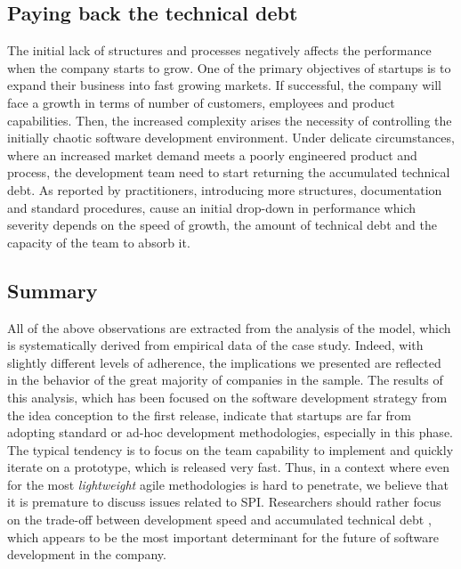 \documentclass[10pt,journal,letterpaper,compsoc]{IEEEtran}
\begin{document}
\subsection{Paying back the technical debt} 
The initial lack of structures and processes negatively affects the  
performance when the company starts to grow.
One of the primary objectives of  startups is to expand their business into fast
growing markets. If  successful, the company will face a growth in terms of
number of customers,  employees and product capabilities. Then, the increased
complexity arises the  necessity of controlling the initially chaotic software
development environment.  Under delicate circumstances, where an increased
market demand meets a poorly  engineered product and process, the development
team need to start returning  the accumulated technical debt. As reported by
practitioners, introducing more  structures, documentation and standard
procedures, cause an initial drop-down in  performance which severity depends on
the speed of growth, the amount of  technical debt and the capacity of the team
to absorb it.  



\subsection{Summary} All of the above observations are extracted from the
analysis of the model,  which is systematically derived from empirical data of
the case study. Indeed,  with slightly different levels of adherence, the
implications we presented are  reflected in the behavior of the great majority
of companies in the sample. The  results of this analysis, which has been
focused on the software development  strategy from the idea conception to the
first release, indicate that startups  are far from adopting standard or ad-hoc
development methodologies, especially  in this phase. The typical tendency is to
focus on the team capability to  implement and quickly iterate on a prototype,
which is released very fast. Thus,  in a context where even for the most
\textit{lightweight} agile methodologies is  hard to penetrate, we believe that
it is premature to discuss issues related to  SPI. Researchers should rather
focus on the trade-off between development speed  and accumulated technical debt
\cite{Brown:2010:MTD:1882362.1882373}, which  appears to be the most important
determinant for the future of  software development in the company.
\end{document}
